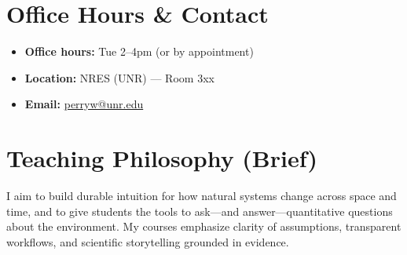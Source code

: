 \section*{Office Hours \& Contact}
\begin{itemize}
  \item \textbf{Office hours:} Tue 2–4pm (or by appointment)
  \item \textbf{Location:} NRES (UNR) — Room 3xx
  \item \textbf{Email:} \href{mailto:perryw@unr.edu}{perryw@unr.edu}
\end{itemize}

\section*{Teaching Philosophy (Brief)}
I aim to build durable intuition for how natural systems change across space and time, and to give students the tools to ask—and answer—quantitative questions about the environment. My courses emphasize clarity of assumptions, transparent workflows, and scientific storytelling grounded in evidence.

